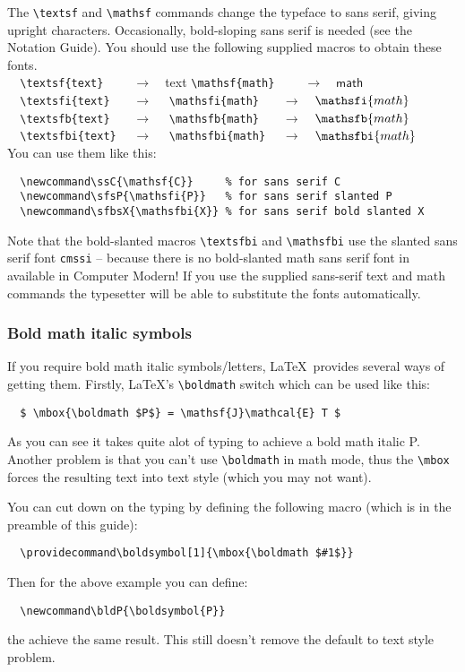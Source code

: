 \documentclass{jfm}
\newcommand\lra{\ensuremath{\quad\longrightarrow\quad}}
\newcommand\bldP{\boldsymbol{P}}
\newcommand\ssC{\mathsf{C}}    %
\newcommand\sfsP{\mathsfi{P}}  %
\begin{document}
The \verb"\textsf" and \verb"\mathsf" commands change the typeface to
sans serif, giving upright characters. Occasionally, bold-sloping sans serif
is needed (see the Notation Guide). You should use the following supplied
macros to obtain these fonts.\\[6pt]
%
\verb"  \textsf{text}  " \lra \textsf{text}
  \qquad \verb"\mathsf{math}  " \lra $\mathsf{math}$\\
\verb"  \textsfi{text} " \lra {}
  \qquad \verb"\mathsfi{math} " \lra $\mathsfi{math}$\\
\verb"  \textsfb{text} " \lra {}
  \qquad \verb"\mathsfb{math} " \lra $\mathsfb{math}$\\
\verb"  \textsfbi{text}" \lra {}
  \qquad \verb"\mathsfbi{math}" \lra $\mathsfbi{math}$\\[6pt]
%
You can use them like this:
%
\begin{verbatim}
  \newcommand\ssC{\mathsf{C}}     % for sans serif C
  \newcommand\sfsP{\mathsfi{P}}   % for sans serif slanted P
  \newcommand\sfbsX{\mathsfbi{X}} % for sans serif bold slanted X
\end{verbatim}
%
Note that the bold-slanted macros \verb"\textsfbi" and
\verb"\mathsfbi" use the slanted sans serif font \verb"cmssi"
-- because there is no bold-slanted math sans serif font in available in
Computer Modern!  If you use the supplied sans-serif text and math commands
the typesetter will be able to substitute the fonts automatically.

\subsubsection{Bold math italic symbols}

If you require bold math italic symbols/letters, \LaTeX\ provides several ways
of getting them.  Firstly, \LaTeX's \verb"\boldmath" switch which can be
used like this:
\begin{verbatim}
  $ \mbox{\boldmath $P$} = \mathsf{J}\mathcal{E} T $
\end{verbatim}
As you can see it takes quite alot of typing to achieve a bold math italic P.
Another problem is that you can't use \verb"\boldmath" in math mode, thus the
\verb"\mbox" forces the resulting text into text style (which you may not
want).

You can cut down on the typing by defining the following macro (which
is in the preamble of this guide):
\begin{verbatim}
  \providecommand\boldsymbol[1]{\mbox{\boldmath $#1$}}
\end{verbatim}
Then for the above example you can define:
\begin{verbatim}
  \newcommand\bldP{\boldsymbol{P}}
\end{verbatim}
the achieve the same result. This still doesn't remove the default to
text style problem.
\end{document}
